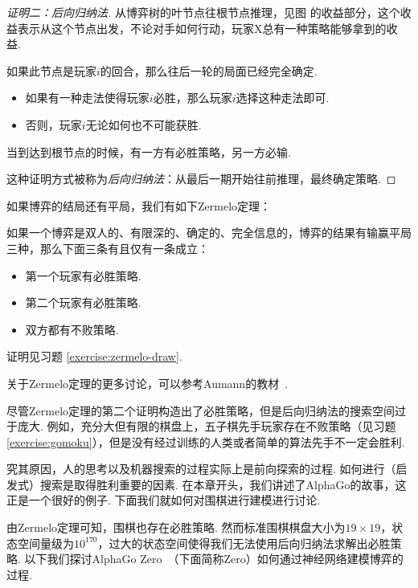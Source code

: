 \begin{proof}[证明二：后向归纳法]
从博弈树的叶节点往根节点推理，见图 的收益部分，这个收益表示从这个节点出发，不论对手如何行动，玩家X总有一种策略能够拿到的收益. 

如果此节点是玩家$i$的回合，那么往后一轮的局面已经完全确定.
\begin{itemize}
    \item 如果有一种走法使得玩家$i$必胜，那么玩家$i$选择这种走法即可.
    \item 否则，玩家$i$无论如何也不可能获胜.
\end{itemize}

当到达到根节点的时候，有一方有必胜策略，另一方必输.

这种证明方式被称为\textit{后向归纳法}：从最后一期开始往前推理，最终确定策略.
\end{proof}

如果博弈的结局还有平局，我们有如下Zermelo定理：
\begin{theorem}[有平局的Zermelo定理]\label{theorem:zermelo-draw}
如果一个博弈是双人的、有限深的、确定的、完全信息的，博弈的结果有输赢平局三种，那么下面三条有且仅有一条成立：
\begin{itemize}
    \item 第一个玩家有必胜策略.
    \item 第二个玩家有必胜策略.
    \item 双方都有不败策略.
\end{itemize}
\end{theorem}
证明见习题 \ref{exercise:zermelo-draw}.

\begin{remark}
    关于Zermelo定理的更多讨论，可以参考Aumann的教材~\cite{aumannLecturesGameTheory1989}. 
\end{remark}

尽管Zermelo定理的第二个证明构造出了必胜策略，但是后向归纳法的搜索空间过于庞大. 例如，充分大但有限的棋盘上，五子棋先手玩家存在不败策略（见习题 \ref{exercise:gomoku}），但是没有经过训练的人类或者简单的算法先手不一定会胜利. 

究其原因，人的思考以及机器搜索的过程实际上是前向探索的过程. 如何进行（启发式）搜索是取得胜利重要的因素. 在本章开头，我们讲述了AlphaGo的故事，这正是一个很好的例子. 下面我们就如何对围棋进行建模进行讨论.

由Zermelo定理可知，围棋也存在必胜策略. 然而标准围棋棋盘大小为$19\times 19$，状态空间量级为$10^{170}$，过大的状态空间使得我们无法使用后向归纳法求解出必胜策略. 以下我们探讨AlphaGo Zero~\cite{silverMasteringGameGo2017}（下面简称Zero）如何通过神经网络建模博弈的过程.

